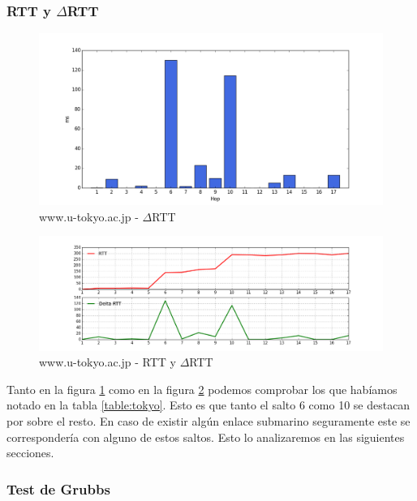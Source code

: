 \subsubsection{RTT y $\Delta$RTT}

\begin{figure}[H]
    \begin{center}
        \includegraphics[width=1\textwidth]{data/rtt-tokyo-bar.png}
        \caption{www.u-tokyo.ac.jp - $\Delta$RTT}
        \label{histo:tokyo}
    \end{center}
\end{figure}

\begin{figure}[H]
    \begin{center}
        \includegraphics[width=1\textwidth]{data/rtt-tokyo-lines.png}
        \caption{www.u-tokyo.ac.jp - RTT y $\Delta$RTT}
        \label{lines:tokyo}
    \end{center}
\end{figure}

Tanto en la figura \ref{histo:tokyo} como en la figura \ref{lines:tokyo} podemos comprobar los que habíamos notado en la tabla \ref{table:tokyo}. Esto es que tanto el salto 6 como 10 se destacan por sobre el resto. En caso de existir algún enlace submarino seguramente este se correspondería con alguno de estos saltos. Esto lo analizaremos en las siguientes secciones.

\subsubsection{Test de Grubbs}\label{tokyo:grubbs}

